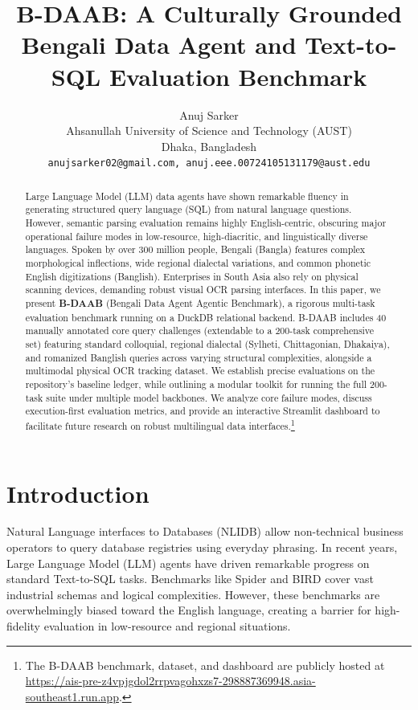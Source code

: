 \documentclass[11pt,a4paper]{article}
\title{\textbf{B-DAAB}: A Culturally Grounded Bengali Data Agent and Text-to-SQL Evaluation Benchmark}
\author{Anuj Sarker \\
  Ahsanullah University of Science and Technology (AUST) \\
  Dhaka, Bangladesh \\
  \texttt{anujsarker02@gmail.com, anuj.eee.00724105131179@aust.edu} \\}
\date{}
\begin{document}
\maketitle

\begin{abstract}
Large Language Model (LLM) data agents have shown remarkable fluency in generating structured query language (SQL) from natural language questions. However, semantic parsing evaluation remains highly English-centric, obscuring major operational failure modes in low-resource, high-diacritic, and linguistically diverse languages. Spoken by over 300 million people, Bengali (Bangla) features complex morphological inflections, wide regional dialectal variations, and common phonetic English digitizations (Banglish). Enterprises in South Asia also rely on physical scanning devices, demanding robust visual OCR parsing interfaces. In this paper, we present \textbf{B-DAAB} (Bengali Data Agent Agentic Benchmark), a rigorous multi-task evaluation benchmark running on a DuckDB relational backend. B-DAAB includes 40 manually annotated core query challenges (extendable to a 200-task comprehensive set) featuring standard colloquial, regional dialectal (Sylheti, Chittagonian, Dhakaiya), and romanized Banglish queries across varying structural complexities, alongside a multimodal physical OCR tracking dataset. We establish precise evaluations on the repository's baseline ledger, while outlining a modular toolkit for running the full 200-task suite under multiple model backbones. We analyze core failure modes, discuss execution-first evaluation metrics, and provide an interactive Streamlit dashboard to facilitate future research on robust multilingual data interfaces.\footnote{The B-DAAB benchmark, dataset, and dashboard are publicly hosted at \url{https://ais-pre-z4vpjgdol2rrpvagohxzs7-298887369948.asia-southeast1.run.app}.}
\end{abstract}

\section{Introduction}
Natural Language interfaces to Databases (NLIDB) allow non-technical business operators to query database registries using everyday phrasing. In recent years, Large Language Model (LLM) agents have driven remarkable progress on standard Text-to-SQL tasks. Benchmarks like Spider \cite{yu2018spider} and BIRD \cite{li2023bird} cover vast industrial schemas and logical complexities. However, these benchmarks are overwhelmingly biased toward the English language, creating a barrier for high-fidelity evaluation in low-resource and regional situations.
\end{document}
